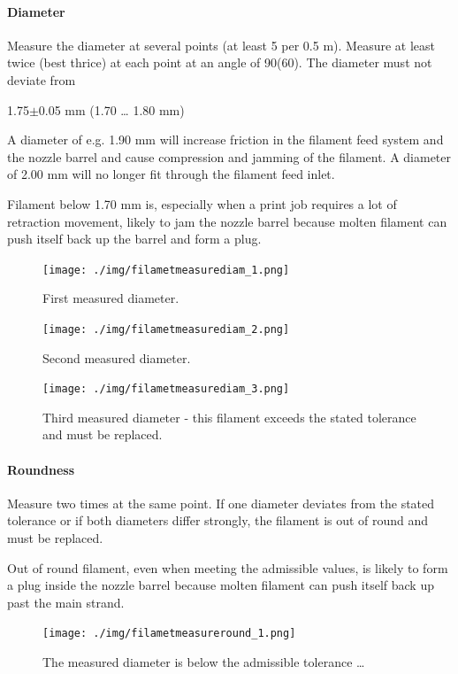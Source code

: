 \paragraph{Diameter}

Measure the diameter at several points (at least 5 per 0.5 m).
Measure at least twice (best thrice) at each point at an angle of 90\degree (60\degree). The diameter must not deviate from 

1.75$\pm$0.05 mm (1.70 … 1.80 mm)

A diameter of e.g. 1.90 mm will increase friction in the filament feed system and the nozzle barrel and cause compression and jamming of the filament.
A diameter of 2.00 mm will no longer fit through the filament feed inlet.

Filament below 1.70 mm is, especially when a print job requires a lot of retraction movement, likely to jam the nozzle barrel because molten filament can push itself back up the barrel and form a plug. 

\begin{figure}[H]
  \centering
  \texttt{[image: ./img/filametmeasurediam\_1.png]}
  \caption{First measured diameter.}
\end{figure}


\begin{figure}[H]
  \centering
  \texttt{[image: ./img/filametmeasurediam\_2.png]}
  \caption{Second measured diameter.}
\end{figure}


\begin{figure}[H]
  \centering
  \texttt{[image: ./img/filametmeasurediam\_3.png]}
  \caption{Third measured diameter - this filament exceeds the stated tolerance and must be 
           replaced.}
\end{figure}


\paragraph{Roundness}

Measure two times at the same point.
If one diameter deviates from the stated tolerance or if both diameters differ strongly, the filament is out of round and must be replaced.

Out of round filament, even when meeting the admissible values, is likely to form a plug inside the nozzle barrel because molten filament can push itself back up past the main strand. 

\begin{figure}[H]
  \centering
  \texttt{[image: ./img/filametmeasureround\_1.png]}
  \caption{The measured diameter is below the admissible tolerance …}
\end{figure}

